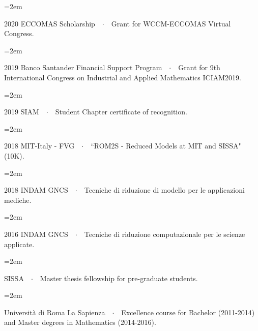 \documentclass[
  usegeometry%
]{scrartcl}
\newcommand{\Description}[1]{\hangindent=2em\hangafter=0\noindent\raggedright\footnotesize{#1}\par\normalsize\vspace{1em}} %
\begin{document}
\begin{cv}{}
\Description{{\color{violet}2020 ECCOMAS Scholarship}\ \ $\cdotp$\ \   Grant for WCCM-ECCOMAS Virtual Congress.}

\vspace{-0.5em} %

\Description{{\color{violet}2019 Banco Santander Financial Support Program}\ \ $\cdotp$\ \   Grant for 9th International Congress on Industrial and Applied Mathematics ICIAM2019.}

\vspace{-0.5em} %

\Description{{\color{violet}2019 SIAM}\ \ $\cdotp$\ \  Student Chapter certificate of recognition.}

\vspace{-0.5em} %

\Description{{\color{violet}2018 MIT-Italy - FVG}\ \ $\cdotp$\ \  ``ROM2S - Reduced Models at MIT and SISSA" (10K).}

\vspace{-0.5em} %

\Description{{\color{violet}2018 INDAM GNCS}\ \ $\cdotp$\ \  Tecniche di riduzione di modello per le applicazioni mediche.}

\vspace{-0.5em} %
%
\Description{{\color{violet}2016 INDAM GNCS}\ \ $\cdotp$\ \  Tecniche di riduzione computazionale per le scienze applicate.}

\vspace{-0.5em} %

\Description{{\color{violet}SISSA}\ \ $\cdotp$\ \ Master thesis fellowship for pre-graduate students.}

\vspace{-0.5em} %

\Description{{\color{violet}Università di Roma La Sapienza}\ \ $\cdotp$\ \ Excellence course for Bachelor (2011-2014) and Master degrees in Mathematics (2014-2016).}


\end{cv}
\end{document}
